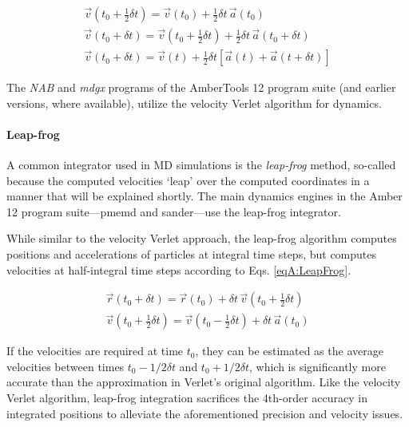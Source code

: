 \begin{align}
   \vec{v}\left(t_0 + \frac 1 2 \delta t\right) = \vec{v}(t_0) + \frac 1 2
         \delta t \, \vec{a}(t_0) \nonumber \\
   \vec{v}(t_0 + \delta t) = \vec{v}\left(t_0 + \frac 1 2 \delta t\right) +
         \frac 1 2 \delta t \, \vec{a}(t_0 + \delta t) \nonumber \\
   \vec{v}(t_0 + \delta t) = \vec{v}(t) + \frac 1 2 \delta t \left[ \vec{a}(t) +
         \vec{a}(t + \delta t) \right]
   \label{eqA:VelVerletVelocities}
\end{align}

The \emph{NAB} and \emph{mdgx} programs of the AmberTools 12 program suite (and
earlier versions, where available), utilize the velocity Verlet algorithm for
dynamics.

\paragraph{Leap-frog}

A common integrator used in MD simulations is the \emph{leap-frog} method,
so-called because the computed velocities `leap' over the computed coordinates
in a manner that will be explained shortly. The main dynamics engines in the
Amber 12 program suite---pmemd and sander---use the leap-frog integrator.

While similar to the velocity Verlet approach, the leap-frog algorithm computes
positions and accelerations of particles at integral time steps, but
computes velocities at half-integral time steps according to Eqs.
\ref{eqA:LeapFrog}.

\begin{align}
   \vec{r}(t_0 + \delta t) = \vec{r}(t_0) + \delta t \, \vec{v}\left(t_0 + \frac
         1 2 \delta t \right) \nonumber \\
   \vec{v}\left(t_0 + \frac 1 2 \delta t\right) = \vec{v}\left(t_0 - \frac 1 2
         \delta t \right) + \delta t \, \vec{a}(t_0)
   \label{eqA:LeapFrog}
\end{align}

If the velocities are required at time $t_0$, they can be estimated as the
average velocities between times $t_0 - 1/2\delta t$ and $t_0 + 1/2 \delta t$,
which is significantly more accurate than the approximation in Verlet's original
algorithm. Like the velocity Verlet algorithm, leap-frog integration sacrifices
the 4th-order accuracy in integrated positions to alleviate the aforementioned
precision and velocity issues. \cite{Allen_Tildesley}
